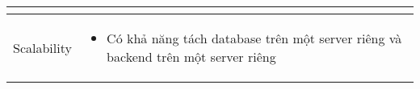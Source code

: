 \begin{center}
\begin{tabular}{ |m{3cm}|m{10cm}|}
\begin{itemize}
                         \end{itemize}                                                                          \\
        \hline
        Scalability    & \begin{itemize}
            \item Có khả năng tách database trên một server riêng và backend trên một
            server riêng      
        \end{itemize}                                                                                                                                                       \\
        \hline
    \end{tabular}
\end{center}
